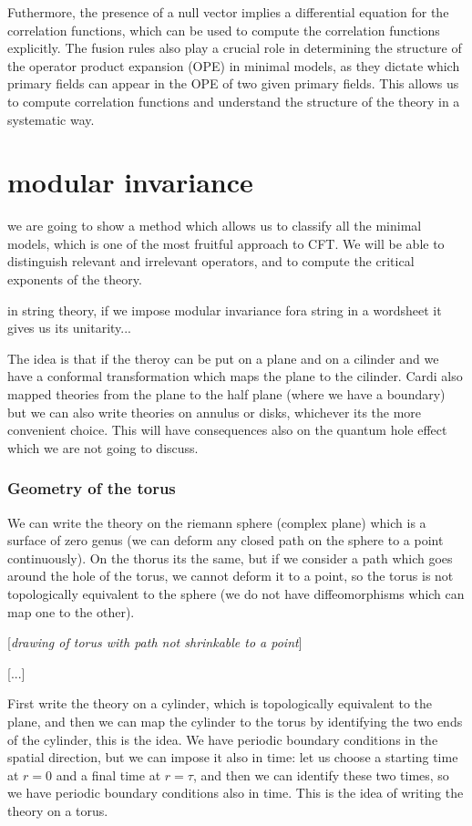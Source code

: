 Futhermore, the presence of a null vector implies a differential equation for the correlation functions, which can be used to compute the correlation functions explicitly. The fusion rules also play a crucial role in determining the structure of the operator product expansion (OPE) in minimal models, as they dictate which primary fields can appear in the OPE of two given primary fields. This allows us to compute correlation functions and understand the structure of the theory in a systematic way.




\section{modular invariance}

we are going to show a method which allows us to classify all the minimal models, which is one of the most fruitful approach to CFT. We will be able to distinguish relevant and irrelevant operators, and to compute the critical exponents of the theory.

in string theory, if we impose modular invariance fora string in a wordsheet it gives us its unitarity...

The idea is that if the theroy can be put on a plane and on a cilinder and we have a conformal transformation which maps the plane to the cilinder. Cardi also mapped theories from the plane to the half plane (where we have a boundary) but we can also write theories on annulus or disks, whichever its the more convenient choice. This will have consequences also on the quantum hole effect which we are not going to discuss.

\subsubsection{Geometry of the torus}

We can write the theory on the riemann sphere (complex plane) which is a surface of zero genus (we can deform any closed path on the sphere to a point continuously). On the thorus its the same, but if we consider a path which goes around the hole of the torus, we cannot deform it to a point, so the torus is not topologically equivalent to the sphere (we do not have diffeomorphisms which can map one to the other).

    [\textit{drawing of torus with path not shrinkable to a point}]

    [...]

First write the theory on a cylinder, which is topologically equivalent to the plane, and then we can map the cylinder to the torus by identifying the two ends of the cylinder, this is the idea. We have periodic boundary conditions in the spatial direction, but we can impose it also in time: let us choose a starting time at \(r=0\) and a final time at \(r=\tau\), and then we can identify these two times, so we have periodic boundary conditions also in time. This is the idea of writing the theory on a torus.

